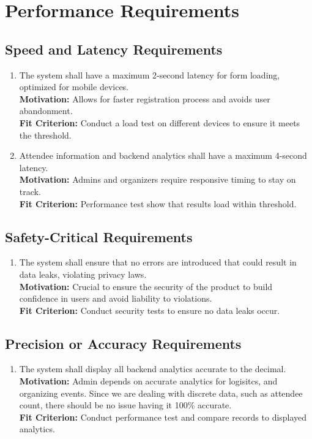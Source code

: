 \documentclass[12pt]{article}
\begin{document}
\section{Performance Requirements}
\subsection{Speed and Latency Requirements}
\begin{enumerate}[label=\bfseries PR-\arabic*:, wide=0pt, leftmargin=*]
  \item \label{PSLR1} The system shall have a maximum 2-second latency for form loading, optimized for mobile devices.\\
  {\bf Motivation:} Allows for faster registration process and avoids user abandonment.\\
  {\bf Fit Criterion:} Conduct a load test on different devices to ensure it meets the threshold.
  \item \label{PSLR2} Attendee information and backend analytics shall have a maximum 4-second latency.\\
  {\bf Motivation:} Admins and organizers require responsive timing to stay on track.\\
  {\bf Fit Criterion:} Performance test show that results load within threshold.
\end{enumerate}

\subsection{Safety-Critical Requirements}
\begin{enumerate}[label=\bfseries SC-\arabic*:, wide=0pt, leftmargin=*]
  \item The system shall ensure that no errors are introduced that could result in data leaks, violating privacy laws.\\
  {\bf Motivation:} Crucial to ensure the security of the product to build confidence in users and avoid liability to violations.\\
  {\bf Fit Criterion:} Conduct security tests to ensure no data leaks occur.
\end{enumerate}

\subsection{Precision or Accuracy Requirements}
\begin{enumerate}[label=\bfseries PC-\arabic*:, wide=0pt, leftmargin=*]
  \item The system shall display all backend analytics accurate to the decimal.\\
  {\bf Motivation:} Admin depends on accurate analytics for logisitcs, and organizing events. Since we are dealing with discrete data, such as attendee count, there should be no issue having it 100\% accurate.\\
  {\bf Fit Criterion:} Conduct performance test and compare records to displayed analytics.
\end{enumerate}
\end{document}
